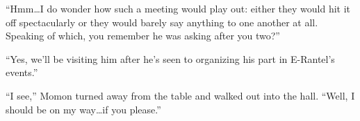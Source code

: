  

“Hmm…I do wonder how such a meeting would play out: either they would hit it off spectacularly or they would barely say anything to one another at all. Speaking of which, you remember he was asking after you two?”

 

“Yes, we’ll be visiting him after he’s seen to organizing his part in E-Rantel’s events.”

 

“I see,” Momon turned away from the table and walked out into the hall. “Well, I should be on my way…if you please.”